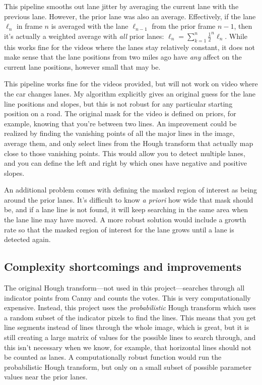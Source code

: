 \documentclass{article}
\begin{document}
This pipeline smooths out lane jitter by averaging the current lane with the previous lane. However, the prior lane was also an average. Effectively, if the lane $\ell_n$ in frame $n$ is averaged with the lane $\ell_{n-1}$ from the prior frame $n-1$, then it's actually a weighted average with \textit{all} prior lanes: $\ell_n = \sum_{k=1}^n \frac{1}{2}^n \ell_n$. While this works fine for the videos where the lanes stay relatively constant, it does not make sense that the lane positions from two miles ago have \textit{any} affect on the current lane positions, however small that may be.

This pipeline works fine for the videos provided, but will not work on video where the car changes lanes. My algorithm explicitly gives an original guess for the lane line positions and slopes, but this is not robust for any particular starting position on a road. The original mask for the video is defined on priors, for example, knowing that you're between two lines. An improvement could be realized by finding the vanishing points of all the major lines in the image, average them, and only select lines from the Hough transform that actually map close to those vanishing points. This would allow you to detect multiple lanes, and you can define the left and right by which ones have negative and positive slopes.

An additional problem comes with defining the masked region of interest as being around the prior lanes. It's difficult to know \textit{a priori} how wide that mask should be, and if a lane line is not found, it will keep searching in the same area when the lane line may have moved. A more robust solution would include a growth rate so that the masked region of interest for the lane grows until a lane is detected again.

\subsection{Complexity shortcomings and improvements}

The original Hough transform---not used in this project---searches through all indicator points from Canny and counts the votes. This is very computationally expensive. Instead, this project uses the \textit{probabilistic} Hough transform which uses a random subset of the indicator pixels to find the lines. This means that you get line segments instead of lines through the whole image, which is great, but it is still creating a large matrix of values for the possible lines to search through, and this isn't necessary when we know, for example, that horizontal lines should not be counted as lanes. A computationally robust function would run the probabilistic Hough transform, but only on a small subset of possible parameter values near the prior lanes.
\end{document}
